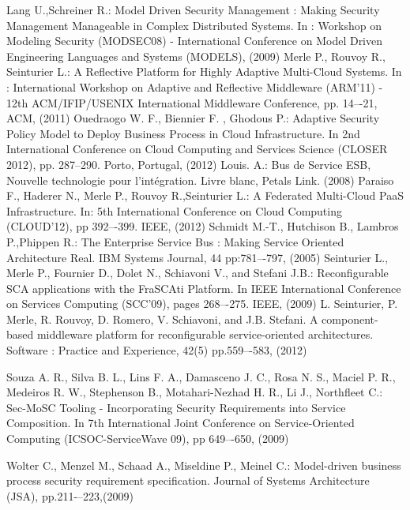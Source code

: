 \documentclass[runningheads,a4paper]{llncs}
\begin{document}
\begin{thebibliography}{4}

  Lang U.,Schreiner R.: Model Driven Security Management : Making
Security Management Manageable in Complex Distributed Systems. In : Workshop on Modeling Security (MODSEC08) - International Conference on Model
Driven Engineering Languages and Systems (MODELS), (2009)
 Merle P., Rouvoy R., Seinturier L.: A Reflective Platform for Highly Adaptive Multi-Cloud Systems. In : International Workshop
on Adaptive and Reflective Middleware (ARM’11) - 12th ACM/IFIP/USENIX
International Middleware Conference, pp. 14–-21, ACM, (2011)
  Ouedraogo W. F., Biennier F. , Ghodous P.:
Adaptive Security Policy Model to Deploy Business Process in Cloud Infrastructure. In 2nd International Conference on Cloud Computing and Services Science (CLOSER 2012), pp. 287--290. Porto, Portugal, (2012)
 Louis. A.: Bus de Service ESB, Nouvelle technologie pour l’int\'egration. Livre blanc, Petals Link. (2008)
 Paraiso F., Haderer N., Merle P., Rouvoy R.,Seinturier L.: A Federated Multi-Cloud PaaS Infrastructure. In: 5th International
Conference on Cloud Computing (CLOUD’12), pp 392–-399. IEEE, (2012)
 Schmidt M.-T., Hutchison B., Lambros P.,Phippen R.: The Enterprise
Service Bus : Making Service Oriented Architecture Real. IBM Systems Journal, 44 pp:781–-797, (2005)
Seinturier L., Merle P., Fournier D., Dolet N., Schiavoni V., and Stefani J.B.: Reconfigurable SCA applications with
the FraSCAti Platform. In IEEE International Conference on Services Computing (SCC’09), pages 268–-275. IEEE, (2009)
L. Seinturier, P. Merle, R. Rouvoy, D. Romero, V. Schiavoni, and J.B. Stefani. A component-based middleware platform for reconfigurable service-oriented architectures. Software : Practice and Experience, 42(5) pp.559–-583, (2012)

Souza A. R., Silva B. L., Lins F. A., Damasceno J. C., Rosa N. S.,  Maciel P. R., Medeiros R. W., Stephenson B., Motahari-Nezhad H. R., Li J., Northfleet C.: Sec-MoSC Tooling - Incorporating Security Requirements into Service Composition. In 7th International Joint Conference on Service-Oriented Computing (ICSOC-ServiceWave 09), pp 649–-650, (2009)

Wolter C., Menzel M., Schaad A., Miseldine P., Meinel C.: Model-driven business process security requirement specification. Journal of Systems Architecture (JSA), pp.211-–223,(2009)


\end{thebibliography}
\end{document}
